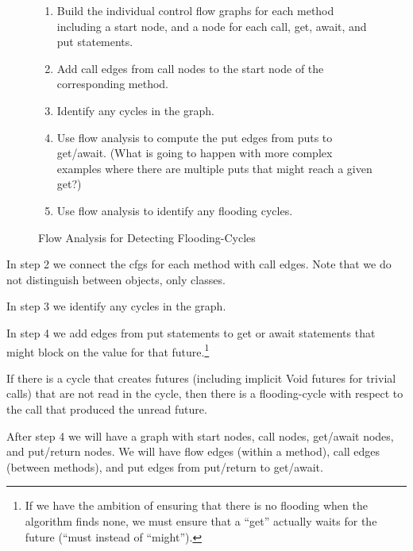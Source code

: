 \documentclass[12pt]{article}%
\begin{document}
\begin{figure}
\begin{shaded}
\begin{enumerate}
\item Build the individual control flow graphs for each method including a start node, and a node for each call, get, await, and put statements.
\item Add call edges from call nodes to the start node of the corresponding method.
\item Identify any cycles in the graph.
\item Use flow analysis to compute the put edges from puts to get/await. (What is going to happen with more complex examples
where there are multiple puts that might reach a given get?)
\item Use flow analysis to identify any flooding cycles.
\end{enumerate}\end{shaded}%
\caption{\label{flow-analysis}
Flow Analysis for Detecting Flooding-Cycles}
\end{figure}

In step 2 we connect the cfgs for each method with call edges. Note that we do not distinguish between objects, only classes.

In step 3 we identify any cycles in the graph.

In step 4 we add edges from put statements to get or await statements that might block on the value for that future.\footnote{If we have the ambition of ensuring that 
there is no flooding when the algorithm finds none,
we must ensure that a ``get'' actually waits for the future
(``must instead of ``might'').}

If there is a cycle that creates futures (including implicit Void futures for trivial calls) that are not read
in the cycle, then there is a flooding-cycle with respect to the call that produced the unread future.

After step 4 we will have a graph with start nodes, call nodes, get/await nodes, and
put/return nodes. We will have flow edges (within a method), call edges (between methods), and put edges from put/return
to get/await.
\end{document}
